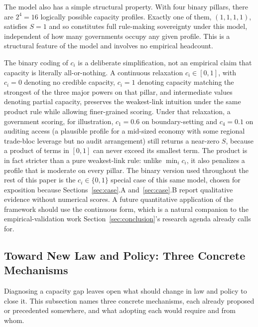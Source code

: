 \documentclass{ieeeaccess}
\begin{document}
The model also has a simple structural property. With four binary pillars, there are $2^4 = 16$ logically possible capacity profiles. Exactly one of them, $(1,1,1,1)$, satisfies $S=1$ and so constitutes full rule-making sovereignty under this model, independent of how many governments occupy any given profile. This is a structural feature of the model and involves no empirical headcount.

The binary coding of $c_i$ is a deliberate simplification, not an empirical claim that capacity is literally all-or-nothing. A continuous relaxation $c_i \in [0,1]$, with $c_i=0$ denoting no credible capacity, $c_i=1$ denoting capacity matching the strongest of the three major powers on that pillar, and intermediate values denoting partial capacity, preserves the weakest-link intuition under the same product rule while allowing finer-grained scoring. Under that relaxation, a government scoring, for illustration, $c_1=0.6$ on boundary-setting and $c_4=0.1$ on auditing access (a plausible profile for a mid-sized economy with some regional trade-bloc leverage but no audit arrangement) still returns a near-zero $S$, because a product of terms in $[0,1]$ can never exceed its smallest term. The product is in fact stricter than a pure weakest-link rule: unlike $\min_i c_i$, it also penalizes a profile that is moderate on every pillar. The binary version used throughout the rest of this paper is the $c_i\in\{0,1\}$ special case of this same model, chosen for exposition because Sections~\ref{sec:case}.A and~\ref{sec:case}.B report qualitative evidence without numerical scores. A future quantitative application of the framework should use the continuous form, which is a natural companion to the empirical-validation work Section~\ref{sec:conclusion}'s research agenda already calls for.

\subsection{Toward New Law and Policy: Three Concrete Mechanisms}

Diagnosing a capacity gap leaves open what should change in law and policy to close it. This subsection names three concrete mechanisms, each already proposed or precedented somewhere, and what adopting each would require and from whom.
\end{document}

